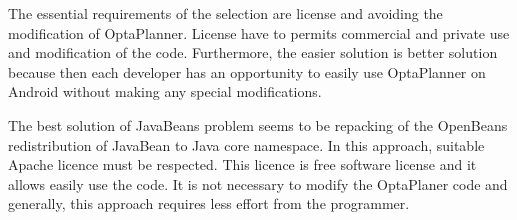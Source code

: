 The essential requirements of the selection are license and avoiding the modification of OptaPlanner. License have to
permits commercial and private use and modification of the code. Furthermore, the easier solution is better solution
because then each developer has an opportunity to easily use OptaPlanner on Android without making any special
modifications.

The best solution of JavaBeans problem seems to be repacking of the OpenBeans redistribution of JavaBean to Java core
namespace. In this approach, suitable Apache licence must be respected. This licence is free software license and it
allows easily use the code. It is not necessary to modify the OptaPlaner code and generally, this approach requires less
effort from the programmer.

\begin {table}[h!]
\end{table}
